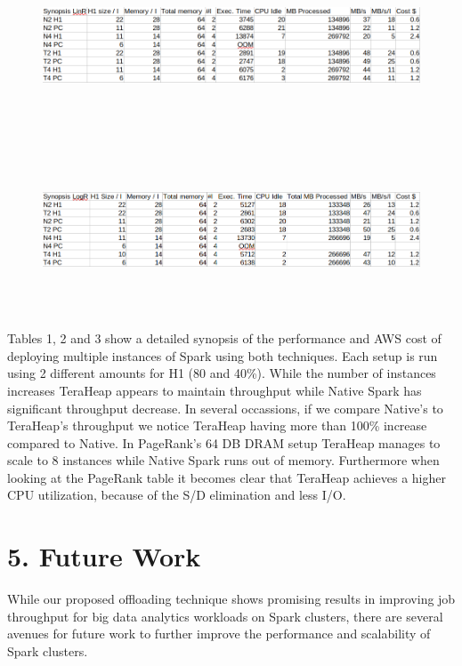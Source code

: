 \documentclass[twocolumn,10pt]{asme2e}
\begin{document}
\begin{figure}[h!]
        \includegraphics[width=18cm,height=5cm]{linr_table.png}
\end{figure}

\begin{figure}[h!]
        \includegraphics[width=18cm,height=5cm]{logr_table.png}
\end{figure}

Tables 1, 2 and 3 show a detailed synopsis of the performance and AWS cost of deploying multiple instances of Spark using both techniques. Each setup is run using 2 different amounts for H1 (80 and 40\%). While the number of instances increases TeraHeap appears to maintain throughput while Native Spark has significant throughput decrease. In several occassions, if we compare Native's to TeraHeap's throughput we notice TeraHeap having more than 100\% increase compared to Native. In PageRank's 64 DB DRAM setup TeraHeap manages to scale to 8 instances while Native Spark runs out of memory. Furthermore when looking at the PageRank table it becomes clear that TeraHeap achieves a higher CPU utilization, because of the S/D elimination and less I/O. 

\section*{5. Future Work}

While our proposed offloading technique shows promising results in improving job throughput for big data analytics workloads on Spark clusters, there are several avenues for future work to further improve the performance and scalability of Spark clusters. 
\end{document}
